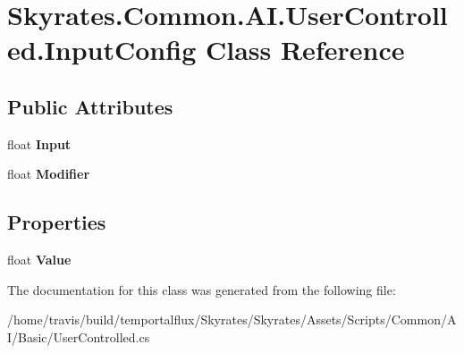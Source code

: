 \hypertarget{class_skyrates_1_1_common_1_1_a_i_1_1_user_controlled_1_1_input_config}{\section{Skyrates.\-Common.\-A\-I.\-User\-Controlled.\-Input\-Config Class Reference}
\label{class_skyrates_1_1_common_1_1_a_i_1_1_user_controlled_1_1_input_config}
}
\subsection*{Public Attributes}
\begin{DoxyCompactItemize}
\item 
\hypertarget{class_skyrates_1_1_common_1_1_a_i_1_1_user_controlled_1_1_input_config_ab6d49c94c657e15b1f8e8b8fd7d32546}{float {\bfseries Input}}\label{class_skyrates_1_1_common_1_1_a_i_1_1_user_controlled_1_1_input_config_ab6d49c94c657e15b1f8e8b8fd7d32546}

\item 
\hypertarget{class_skyrates_1_1_common_1_1_a_i_1_1_user_controlled_1_1_input_config_aeea2ce6e2082fb16681fda44e77fb96b}{float {\bfseries Modifier}}\label{class_skyrates_1_1_common_1_1_a_i_1_1_user_controlled_1_1_input_config_aeea2ce6e2082fb16681fda44e77fb96b}

\end{DoxyCompactItemize}
\subsection*{Properties}
\begin{DoxyCompactItemize}
\item 
\hypertarget{class_skyrates_1_1_common_1_1_a_i_1_1_user_controlled_1_1_input_config_a89e0b0e534313b2872cb068a3015df86}{float {\bfseries Value}}\label{class_skyrates_1_1_common_1_1_a_i_1_1_user_controlled_1_1_input_config_a89e0b0e534313b2872cb068a3015df86}

\end{DoxyCompactItemize}


The documentation for this class was generated from the following file\-:\begin{DoxyCompactItemize}
\item 
/home/travis/build/temportalflux/\-Skyrates/\-Skyrates/\-Assets/\-Scripts/\-Common/\-A\-I/\-Basic/User\-Controlled.\-cs\end{DoxyCompactItemize}
